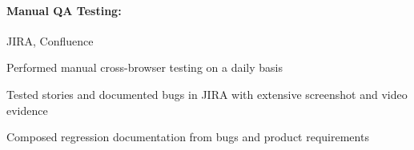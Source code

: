 \begin{position}
  \paragraph{Manual QA Testing:} JIRA, Confluence
  \begin{myitem}
  \item Performed manual cross-browser testing on a daily basis
  \item Tested stories and documented bugs in JIRA with extensive screenshot and video evidence
  \item Composed regression documentation from bugs and product requirements
  \end{myitem}
\end{position}
%
